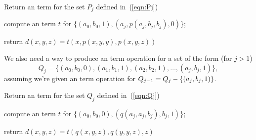 \LinesNumbered
\begin{algorithm}%

\caption{Return an \ld term for the set $P_j$ defined in~(\ref{eqn:Pj})
\label{alg:ild0}}  

compute an \ld term $t$ for $\{(a_0, b_0, 1), (a_j, p(a_j, b_j, b_j), 0)\}$;

return $d(x,y,z) = t(x, p(x,y,y), p(x,y,z))$

\end{algorithm}


We also need a way to produce an \ld
term operation for a set of the form  (for $j>1$)
\begin{equation}
\label{eqn:Qj}
Q_{j} = \{(a_0, b_0, 0), (a_1, b_1, 1), (a_2, b_2, 1), \dots, 
(a_{j}, b_{j}, 1)\},
\end{equation}
assuming we're given an \ld term operation for 
$Q_{j-1} = Q_j - \{(a_j, b_j, 1)\}$.  

\LinesNumbered
\begin{algorithm}%
  \caption{Return an \ld term for the set $Q_j$ defined in~(\ref{eqn:Qj})
  \label{alg:ild1}}  

  compute an \ld term $t$ for $\{(a_0, b_0, 0), (q(a_j, a_j, b_j), b_j, 1)\}$;

  return $d(x,y,z) = t(q(x,y,z), q(y,y,z), z)$
\end{algorithm}

